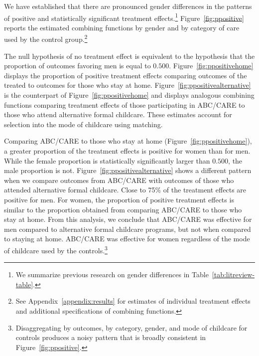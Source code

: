 We have established that there are pronounced gender differences in the patterns of positive and statistically significant treatment effects.\footnote{We summarize previous research on gender differences in Table~\ref{tab:litreview-table}.} Figure~\ref{fig:ppositive} reports the estimated combining functions by gender and by category of care used by the control group.\footnote{See Appendix~\ref{appendix:results} for estimates of individual treatment effects and additional specifications of combining functions.}

The null hypothesis  of no treatment effect is equivalent to the hypothesis that the proportion of outcomes favoring men is equal to $0.500$. Figure~\ref{fig:ppositivehome} displays the proportion of positive treatment effects comparing outcomes of the treated to outcomes for those who stay at home. Figure~\ref{fig:ppositivealternative} is the counterpart of Figure~\ref{fig:ppositivehome} and displays analogous combining functions comparing treatment effects of those participating in ABC/CARE to those who attend alternative formal childcare. These estimates account for selection into the mode of childcare using matching.

Comparing ABC/CARE to those who stay at home (Figure~\ref{fig:ppositivehome}), a greater proportion of the treatment effects is positive for women than for men. While the female proportion is statistically significantly larger than $0.500$, the male proportion is not. Figure~\ref{fig:ppositivealternative} shows a different pattern when we compare outcomes from ABC/CARE with outcomes of those who attended alternative formal childcare. Close to 75\% of the treatment effects are positive for men. For women, the proportion of positive treatment effects is similar to the proportion obtained from comparing ABC/CARE to those who stay at home. From this analysis, we conclude that ABC/CARE was effective for men compared to alternative formal childcare programs, but not when compared to staying at home. ABC/CARE was effective for women regardless of the mode of childcare used by the controls.\footnote{Disaggregating by outcomes, by category, gender, and mode of childcare for controls produces a noisy pattern that is broadly consistent in Figure~\ref{fig:ppositive}.}

